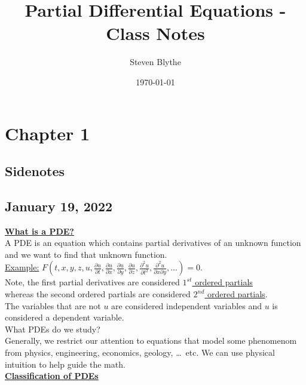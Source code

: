 \documentclass{article}
\title{Partial Differential Equations - Class Notes}
\date{\today}
\author{Steven Blythe}
\newcommand{\topic}[1]{\textbf{\underline{#1}}}
\newcommand{\Ex}{\underline{Example:} }
\begin{document}
\maketitle
\newpage
\section{Chapter 1}
\subsection*{Sidenotes}
\subsection*{January 19, 2022}
\topic{What is a PDE?}\\
A PDE is an equation which contains partial derivatives of an unknown function and we want to find that unknown function.\\
\Ex $F(t, x, y, z, u, \frac{\partial u}{\partial t}, \frac{\partial u}{\partial x}, \frac{\partial u}{\partial y}, \frac{\partial u}{\partial z}, \frac{\partial^2 u}{\partial t^2}, \frac{\partial^2 u}{\partial x \partial y}, \ldots) = 0$.\\
Note, the first partial derivatives are considered \underline{$1^{st}$ ordered partials}\\
whereas the second ordered partials are considered \underline{$2^{nd}$ ordered partials}.\\
The variables that are not $u$ are considered independent variables and $u$ is considered a dependent variable.\\
What PDEs do we study?\\
Generally, we restrict our attention to equations that model some phenomenom from physics, engineering, economics, geology, \ldots\ etc. We can use physical intuition to help guide the math.\\
\topic{Classification of PDEs}
\end{document}
